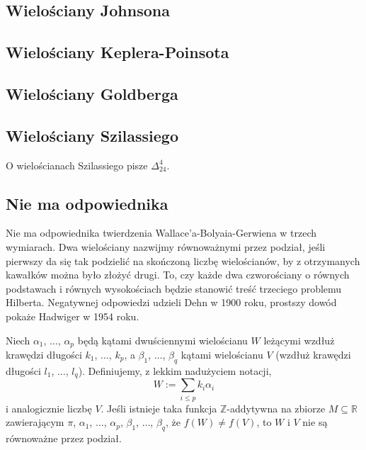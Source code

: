 \subsection{Wielościany Johnsona}


\subsection{Wielościany Keplera-Poinsota}


\subsection{Wielościany Goldberga}

\subsection{Wielościany Szilassiego}
O wielościanach Szilassiego pisze $\Delta_{24}^4$.





\subsection{Nie ma odpowiednika}
Nie ma odpowiednika twierdzenia Wallace'a-Bolyaia-Gerwiena w trzech wymiarach.
Dwa wielościany nazwijmy równoważnymi przez podział, jeśli pierwszy da się tak podzielić na skończoną liczbę wielościanów, by z otrzymanych kawałków można było złożyć drugi.
To, czy każde dwa czworościany o równych podstawach i równych wysokościach będzie stanowić treść trzeciego problemu Hilberta.
Negatywnej odpowiedzi udzieli Dehn w 1900 roku, prostszy dowód pokaże Hadwiger w 1954 roku.

\begin{theorem}[Hadwigera] %
    Niech $\alpha_1$, $\ldots$, $\alpha_p$ będą kątami dwuściennymi wielościanu $W$ leżącymi wzdłuż krawędzi długości $k_1$, $\ldots$, $k_p$, a $\beta_1$, $\ldots$, $\beta_q$ kątami wielościanu $V$ (wzdłuż krawędzi długości $l_1$, $\ldots$, $l_q$).
    Definiujemy, z lekkim nadużyciem notacji,
    \begin{equation}
        W := \sum_{i \le p} k_i \alpha_i
    \end{equation}
    i analogicznie liczbę $V$.
    Jeśli istnieje taka funkcja $\mathbb Z$-addytywna na zbiorze $M \subseteq \mathbb R$ zawierającym $\pi$, $\alpha_1$, $\ldots$, $\alpha_p$, $\beta_1$, $\ldots$, $\beta_q$, że $f(W) \neq f(V)$, to $W$ i $V$ nie są równoważne przez podział.
\end{theorem}

